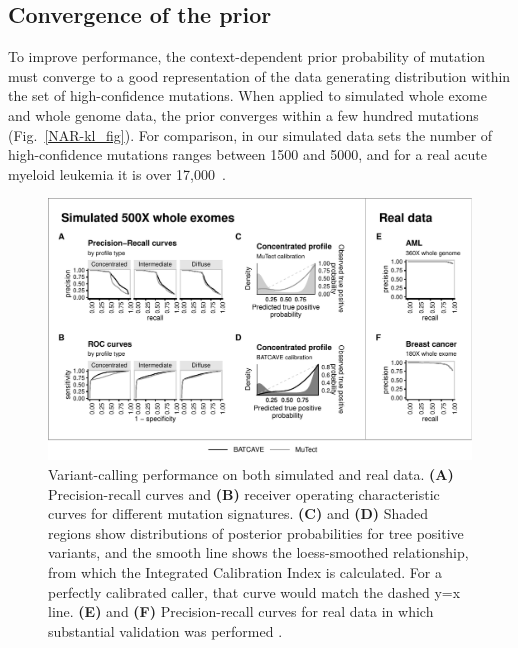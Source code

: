 \documentclass[a4,center,fleqn]{NAR}
\begin{document}
\subsection{Convergence of the prior}
To improve performance, the context-dependent prior probability of mutation must converge to a good representation of the data generating distribution within the set of high-confidence mutations.
When applied to simulated whole exome and whole genome data, the prior converges within a few hundred mutations (Fig.~\ref{NAR-kl_fig}).
For comparison, in our simulated data sets the number of high-confidence mutations ranges between 1500 and 5000, and for a real acute myeloid leukemia it is over 17,000~\cite{Griffith2015}.


  \begin{figure}
    \begin{center}
    \includegraphics[width=\textwidth]{figures/fig_wes.pdf}
    \end{center}
    \caption{Variant-calling performance on both simulated and real data.
    \textbf{(A)} Precision-recall curves and \textbf{(B)} receiver operating characteristic curves for different mutation signatures.
    \textbf{(C)} and \textbf{(D)} Shaded regions show distributions of posterior probabilities for tree positive variants, and the smooth line shows the loess-smoothed relationship, from which the Integrated Calibration Index is calculated. For a perfectly calibrated caller, that curve would match the dashed y=x line. 
    \textbf{(E)} and \textbf{(F)} Precision-recall curves for real data in which substantial validation was performed \cite{Griffith2015,Shi2018}.}

  \label{NAR-wes_fig}
  \end{figure}
  
\end{document}
